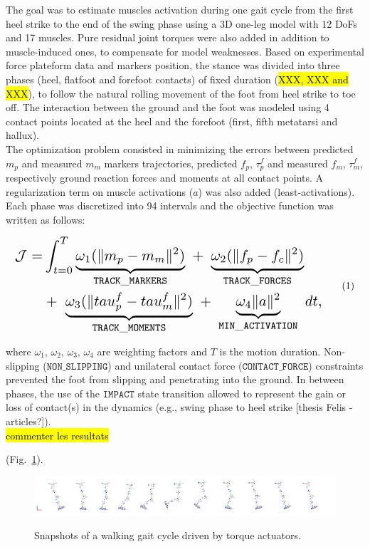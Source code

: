 The goal was to estimate muscles activation during one gait cycle from the first heel strike to the end of the swing phase using a 3D one-leg model with 12 DoFs and 17 muscles. 
Pure residual joint torques were also added in addition to muscle-induced ones, to compensate for model weaknesses.
Based on experimental force plateform data and markers position, the stance was divided into three phases (heel, flatfoot and forefoot contacts) of fixed duration (\hl{XXX, XXX and XXX}), to follow the natural rolling movement of the foot from heel strike to toe off.
The interaction between the ground and the foot was modeled using 4 contact points located at the heel and the forefoot (first, fifth metatarsi and hallux).\\ 
The optimization problem consisted in minimizing the errors between predicted $m_p$ and measured $m_m$ markers trajectories, predicted $f_p$, $\tau^f_p$ and measured $f_m$, $\tau^f_m$, respectively ground reaction forces and moments at all contact points.
A regularization term on muscle activations ($a$) was also added (least-activations).
Each phase was discretized into 94 intervals and the objective function was written as follows:

\[ 
\resizebox{0.9\columnwidth}{!}{$ 
\begin{aligned}
\mathcal{J} = &\int_{t=0}^{T}\underbrace{\omega_1(\|m_p - m_m\|^{2})}_{\mathtt{TRACK\_MARKERS}}~ 
+ ~ \underbrace{\omega_2(\|f_p - f_c\|^{2})}_{\mathtt{TRACK\_FORCES}}\\
&+ ~ \underbrace{\omega_3(\|tau^f_p - tau^f_m\|^{2})}_{\mathtt{TRACK\_MOMENTS}}~
+ ~ \underbrace{\omega_4\|a\|^2}_{\mathtt{MIN\_ACTIVATION}}~dt, 
\end{aligned}  
$}  
\addtag  
\label{eq:ocp_walk}  
\]  

where $\omega_1$, $\omega_2$, $\omega_3$, $\omega_4$ are weighting factors and $T$ is the motion duration.
Non-slipping ($\mathtt{NON\_SLIPPING}$) and unilateral contact force ($\mathtt{CONTACT\_FORCE}$) constraints prevented the foot from slipping and penetrating into the ground. 
In between phases, the use of the $\mathtt{IMPACT}$ state transition allowed to represent the gain or loss of contact(s) in the dynamics (e.g., swing phase to heel strike [thesis Felis - articles?]).\\

\hl{commenter les resultats}

(Fig.~\ref{fig:snapshots_multiphase_walking_cycle}). 

\begin{figure}[t!]
\centering
\includegraphics[width=\textwidth]{figures/multiphase_walking_cycle.png}\\
\caption{Snapshots of a walking gait cycle driven by torque actuators.}
\label{fig:snapshots_multiphase_walking_cycle}
\end{figure}

